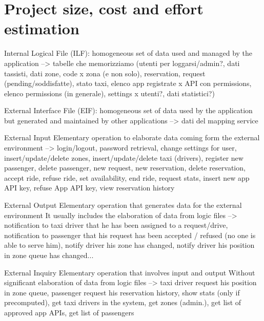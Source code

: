 \chapter{Project size, cost and effort estimation}



Internal Logical File (ILF): homogeneous set of data used and managed by the application --> tabelle che memorizziamo (utenti per loggarsi/admin?, dati tassisti, dati zone, code x zona (e non solo), reservation, request (pending/soddisfatte), stato taxi, elenco app registrate x API con permissions, elenco permissions (in generale), settings x utenti?, dati statistici?) 

External Interface File (EIF): homogeneous set of data used by the application but generated and maintained by other applications --> dati del mapping service

External Input
Elementary operation to elaborate data coming form the external environment --> login/logout, password retrieval, change settings for user, insert/update/delete zones, insert/update/delete taxi (drivers), register new passenger, delete passenger, new request, new reservation, delete reservation, accept ride, refuse ride, set availability, end ride, request stats, insert new app API key, refuse App API key, view reservation history

External Output
Elementary operation that generates data for the external environment
It usually includes the elaboration of data from logic files --> notification to taxi driver that he has been assigned to a request/drive, notification to passenger that his request has been accepted / refused (no one is able to serve him), notify driver his zone has changed, notify driver his position in zone queue has changed... 

External Inquiry
Elementary operation that involves input and output Without significant elaboration of data from logic files --> taxi driver request his position in zone queue, passenger request his reservation history, show stats (only if precomputed), get taxi drivers in the system, get zones (admin.), get list of approved app APIs, get list of passengers